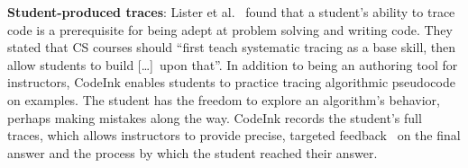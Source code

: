 \noindent \textbf{Student-produced traces}: Lister et
al.~\cite{Lister2004} found that a student's ability to trace code is a
prerequisite for being adept at problem solving and writing code. They
stated that CS courses should ``first teach systematic tracing as a base
skill, then allow students to build [\ldots]\ upon that''.
In addition to being an authoring tool for instructors, CodeInk enables
students to practice tracing algorithmic pseudocode on examples. The
student has the freedom to explore an algorithm's behavior, perhaps
making mistakes along the way. CodeInk records the student's full
traces, which allows instructors to provide precise, targeted
feedback~\cite{Balzer1989} on the final answer and the process by which
the student reached their answer.



